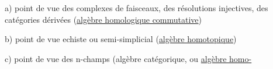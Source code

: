 a) point de vue des complexes de faisceaux, des résolutions injectives,
des catégories dérivées (\uline{algèbre homologique commutative})\hand{,}

b) point de vue echiste ou semi-simplicial (\uline{algèbre homotopique})\hand{,}

c) point de vue des n-champs (algèbre catégorique, ou \uline{algèbre homo-}%

